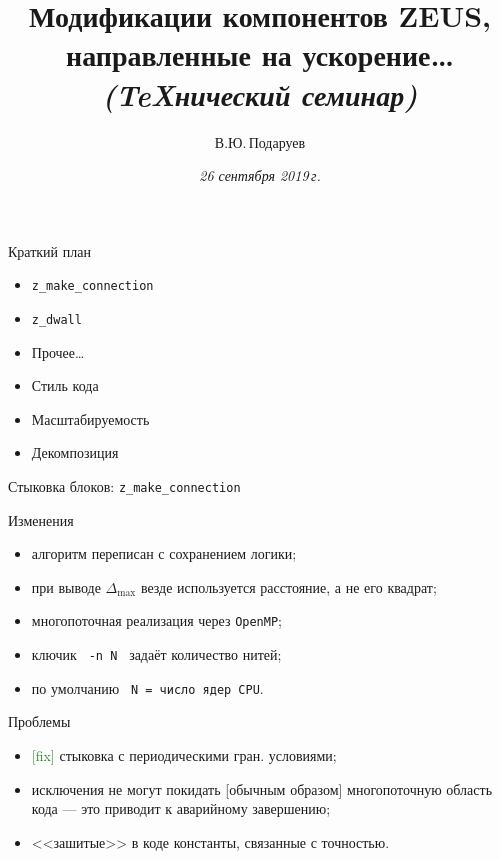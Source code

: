 \documentclass[xcolor={svgnames,table,hyperref},9pt]{beamer}
\title
{
  Модификации компонентов ZEUS,\\
  \hfil направленные на ускорение\ldots\\[1em]
  {\small\itshape (\TeX{}нический семинар)}
}
\author
{
  В.Ю.\,Подаруев
}
\institute[ЦАГИ]
{
  Отделение аэродинамики cиловых установок, ЦАГИ, г.\,Жуковский
}
\date{\itshape 26 сентября 2019\,г.}
\newcommand*{\code}[1]{\texttt{\small #1}}
\begin{document}
\maketitle

\begin{frame}{Краткий план}
  \begin{block}{}
    \begin{itemize}
      \item \code{z\_make\_connection}
      \item \code{z\_dwall}
      \item Прочее\ldots
      \item Стиль кода
      \item Масштабируемость
      \item Декомпозиция
    \end{itemize}
  \end{block}
\end{frame}



\begin{frame}{Стыковка блоков: \texttt{z\_make\_connection}}

  \begin{block}{Изменения}\begin{itemize}
    \item алгоритм переписан с сохранением логики;
    \item при выводе $\Delta_$ везде используется расстояние, а не его квадрат;
    \item многопоточная реализация через \alert{\code{OpenMP}};
    \item ключик \code{ -n N } задаёт количество нитей;
    \item \alert{по умолчанию} \code{ N = число ядер CPU}.
  \end{itemize}\end{block}

  \begin{block}{Проблемы}\begin{itemize}
    \item \textcolor{ForestGreen}{[fix]} стыковка с периодическими гран. условиями;
    \item \alert{исключения} не могут покидать [обычным образом] многопоточную область кода --- это приводит к аварийному завершению;
    \item{} <<зашитые>> в коде константы, связанные с точностью.
  \end{itemize}\end{block}
\end{frame}
\end{document}
